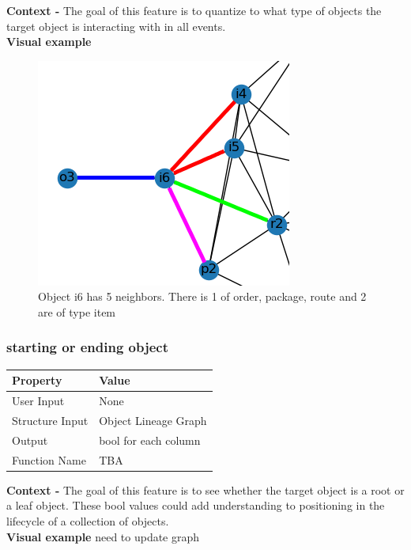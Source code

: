 \documentclass{article}
\begin{document}
\textbf{Context -} The goal of this feature is to quantize to what type of objects the target object is interacting with in all events.
\\

\textbf{Visual example}
\begin{figure}[h]
	\centering
	\includegraphics[scale=0.5]{images/obj-tic.png}
	\caption{Object i6 has 5 neighbors. There is 1 of order, package, route and 2 are of type item}
	\label{fig:obj-tic}
\end{figure}

\subsubsection{starting or ending object}
\begin{center}
	\begin{tabular}{| p{3cm} p{7cm} |}
		\hline
		\textbf{Property} & \textbf{Value}\\
		\hline
		User Input & None\\
		Structure Input & Object Lineage Graph\\
		Output & bool for each column\\
		Function Name & TBA\\
		\hline
	\end{tabular}
\end{center}

\textbf{Context -} The goal of this feature is to see whether the target object is a root or a leaf object. These bool values could add understanding to positioning in the lifecycle of a collection of objects.
\\

\textbf{Visual example}
need to update graph
\end{document}
